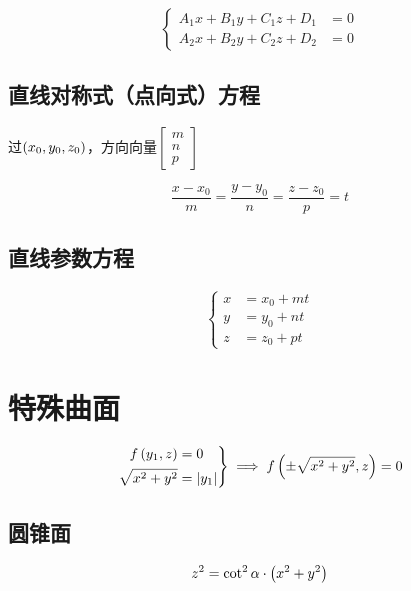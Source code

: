 \documentclass{article}
\begin{document}
\begin{definition}[]
    \[\left\{\begin{aligned}
            A_1x+B_1y+C_1z+D_1 & =0 \\
            A_2x+B_2y+C_2z+D_2 & =0
        \end{aligned}\right.\]
\end{definition}

\subsection{直线对称式（点向式）方程}

过$\left(x_0,y_0,z_0\right)$，方向向量$\begin{bmatrix}m\\n\\p\end{bmatrix}$

\[\frac{x-x_0}m=\frac{y-y_0}n=\frac{z-z_0}p=t\]

\subsection{直线参数方程}

\[\left\{\begin{aligned}
        x & =x_0+mt \\
        y & =y_0+nt \\
        z & =z_0+pt
    \end{aligned}\right.\]

\section{特殊曲面}

\begin{definition}[绕$z$轴旋转曲面：（原曲线为$f\pare{y_1,z}=0$）]
    \[\left.\begin{aligned}
            f\left(y_1,z\right)  & =0         \\
            \sqrt{x^2+y^2} & =\left|y_1\right|
        \end{aligned}\right\}
        \implies
        f\left(\pm\sqrt{x^2+y^2},z\right)=0\]
\end{definition}

\subsection{圆锥面}

\[z^2=\cot^2\alpha\cdot\left(x^2+y^2\right)\]
\end{document}
